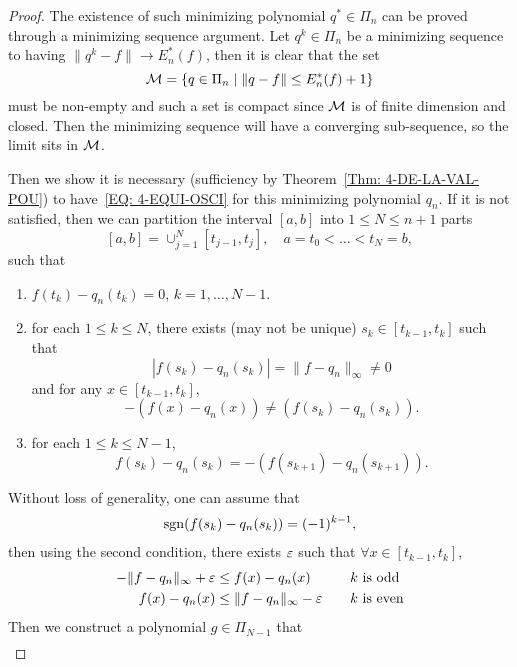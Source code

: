 \begin{proof}
    The existence of such minimizing polynomial $q^{\ast}\in\Pi_n$ can be proved through a minimizing sequence argument. Let $q^k\in \Pi_n$ be a minimizing sequence to having $\|q^k - f\|\to E_n^{\ast}(f)$, then it is clear that the set 
    \begin{equation}
        \mathcal M = \{q\in \Pi_n\mid \|q - f\|\le  E_n^{\ast}(f) + 1\}
    \end{equation}
    must be non-empty and such a set is compact since $\mathcal M$ is of finite dimension and closed. Then the minimizing sequence will have a converging sub-sequence, so the limit sits in $\mathcal M$.

    Then we show it is necessary (sufficiency by Theorem~\ref{Thm: 4-DE-LA-VAL-POU}) to have~\eqref{EQ: 4-EQUI-OSCI} for this minimizing polynomial $q_n$. If it is not satisfied, then we can partition the interval $[a, b]$ into $1\le N\le n+1$ parts 
    $$[a, b]=\cup_{j=1}^N [t_{j-1}, t_j],\quad a = t_0<\dots< t_N = b,$$
    such that 
    \begin{enumerate}
        \item $f(t_k) - q_n(t_k) = 0$, $k = 1,\dots, N-1$.
        \item for each $1\le k\le N$, there exists (may not be unique) $s_k\in [t_{k-1}, t_k]$ such that 
        $$|f(s_k) - q_n(s_k)| = \|f - q_n\|_{\infty}\neq 0$$
        and for any $x\in [t_{k-1}, t_k]$, 
        $$-(f(x) - q_n(x)) \neq (f(s_k) - q_n(s_k)).$$
        \item for each $1\le k\le N-1$, 
        $$f(s_k) - q_n(s_k) = -(f(s_{k+1}) - q_n(s_{k+1}) ).$$
    \end{enumerate}
    Without loss of generality, one can assume that 
    \begin{eqnarray}
        \operatorname{sgn}(f(s_k) - q_n(s_k)) = (-1)^{k-1}, 
    \end{eqnarray}
    then using the second condition, there exists $\varepsilon$ such that $\forall x\in [t_{k-1}, t_k]$,
    \begin{equation}
        \begin{aligned}
            -\|f-q_n\|_{\infty} + \varepsilon &\le  f(x) - q_n(x)\quad& k &\text{ is odd}\\
            f(x) - q_n(x) &\le \|f-q_n\|_{\infty} - \varepsilon\quad& k &\text{ is even}     
        \end{aligned}
    \end{equation}
    Then we construct a polynomial $g\in \Pi_{N-1}$ that 
    \begin{eqnarray}

\end{eqnarray}
\end{proof}
